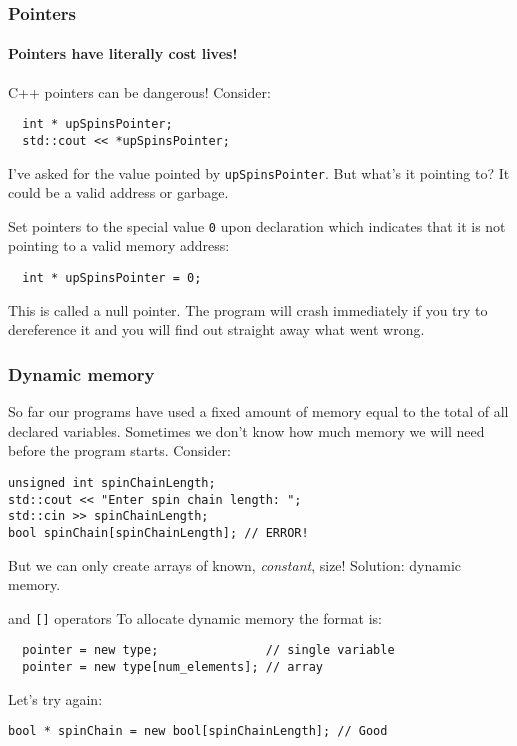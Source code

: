 \documentclass{beamer}
\begin{document}
\begin{frame}[fragile]
  \frametitle{Pointers}
  \framesubtitle{Pointers have literally cost lives!}
  \begin{warnblocke}
    C++ pointers can be dangerous!  Consider:
    \begin{lstlisting}
  int * upSpinsPointer;
  std::cout << *upSpinsPointer;
    \end{lstlisting}
    I've asked for the value pointed by \texttt{upSpinsPointer}.  But what's it pointing to?  It could be a valid address or garbage.
  \end{warnblocke}
  \pause
  \begin{doblocke}
    Set pointers to the special value \texttt{0} upon declaration which indicates that it is not pointing to a valid memory address:
    \begin{lstlisting}
  int * upSpinsPointer = 0;
    \end{lstlisting}
    This is called a null pointer.  The program will crash immediately if you try to dereference it and you will find out straight away what went wrong.
  \end{doblocke}

\end{frame}

\begin{frame}[fragile]
  \frametitle{Dynamic memory}
  So far our programs have used a fixed amount of memory equal to the total of all declared variables.  Sometimes we don't know how much memory we will need before the program starts.
  \pause
  Consider:
  \begin{lstlisting}
unsigned int spinChainLength;
std::cout << "Enter spin chain length: ";
std::cin >> spinChainLength;
bool spinChain[spinChainLength]; // ERROR!
  \end{lstlisting}
  But we can only create arrays of known, \textit{constant}, size!
  \newline\pause
  Solution: dynamic memory.
  \begin{block}{ and \texttt{[]} operators}
	  To allocate dynamic memory the format is:
	  \begin{lstlisting}
  pointer = new type;               // single variable
  pointer = new type[num_elements]; // array
	  \end{lstlisting}
  \end{block}
  \pause
  Let's try again:
  \begin{lstlisting}
bool * spinChain = new bool[spinChainLength]; // Good
  \end{lstlisting}
\end{frame}
\end{document}
